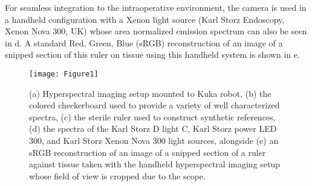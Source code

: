 For seamless integration to the intraoperative environment, the camera is used in a handheld configuration with a Xenon light source (Karl Storz Endoscopy, Xenon Nova 300, UK) whose area normalized emission spectrum can also be seen in d. A standard Red, Green, Blue (sRGB) reconstruction of an image of a snipped section of this ruler on tissue using this handheld system is shown in e.
\begin{figure}[htb]
        \centering
        \texttt{[image: Figure1]}
        \hspace{2mm}
	\caption{(a) Hyperspectral imaging setup mounted to Kuka robot, (b) the colored checkerboard used to provide a variety of well characterized spectra, (c) the sterile ruler used to construct synthetic references, (d) the spectra of the Karl Storz D light C, Karl Storz power LED 300, and Karl Storz Xenon Nova 300 light sources, alongside (e) an sRGB reconstruction of an image of a snipped section of a ruler against tissue taken with the handheld hyperspectral imaging setup whose field of view is cropped due to the scope.}
	\label{fig:setup}
\end{figure}



